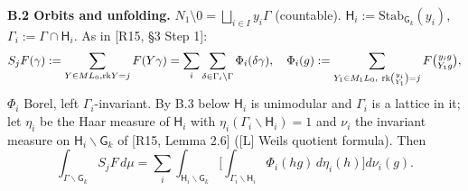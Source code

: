 \textbf{B.2 Orbits and unfolding.} \(N_1\setminus0=\bigsqcup_{i\in I}y_i\Gamma\) (countable). \(\mathsf H_i:=\mathrm{Stab}_{\mathsf G_k}(y_i)\), \(\Gamma_i:=\Gamma\cap\mathsf H_i\). As in {[}R15, §3 Step 1{]}:
\[S_jF(\gamma):=\sum_{Y\in ML_0,\mathrm{rk}Y=j}F(Y\gamma)=\sum_i\sum_{\delta\in\Gamma_i\backslash\Gamma}\Phi_i(\delta\gamma),\quad\Phi_i(g):=\sum_{Y_1\in M_1L_0,\ \mathrm{rk}\binom{y_i}{Y_1}=j}F\tbinom{y_ig}{Y_1g},\]
\(\Phi_i\) Borel, left \(\Gamma_i\)-invariant. By B.3 below \(\mathsf H_i\) is unimodular and \(\Gamma_i\) is a lattice in it; let \(\eta_i\) be the Haar measure of \(\mathsf H_i\) with \(\eta_i(\Gamma_i\backslash\mathsf H_i)=1\) and \(\nu_i\) the invariant measure on \(\mathsf H_i\backslash\mathsf G_k\) of {[}R15, Lemma 2.6{]} ({[}L{]} Weil\textquotesingle s quotient formula). Then
\[\int_{\Gamma\backslash\mathsf G_k}S_jF\,d\mu=\sum_i\int_{\mathsf H_i\backslash\mathsf G_k}\Big[\int_{\Gamma_i\backslash\mathsf H_i}\Phi_i(hg)\,d\eta_i(h)\Big]d\nu_i(g).\tag{B.2}\]

